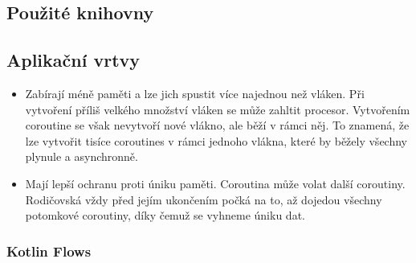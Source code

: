\subsection {Použité knihovny}

\subsection*{Aplikační vrtvy}

\begin{itemize}
	\item Zabírají méně paměti a lze jich spustit více najednou než vláken. Při vytvoření příliš velkého množství vláken se může zahltit procesor. Vytvořením coroutine se však nevytvoří nové vlákno, ale běží v rámci něj. To znamená, že lze vytvořit tisíce coroutines v rámci jednoho vlákna, které by běžely všechny plynule a asynchronně.
	\item Mají lepší ochranu proti úniku paměti.
	Coroutina může volat další coroutiny. Rodičovská vždy před jejím ukončením počká na to, až dojedou všechny potomkové coroutiny, díky čemuž se vyhneme úniku dat.
\end{itemize}

\subsubsection* {Kotlin Flows}
